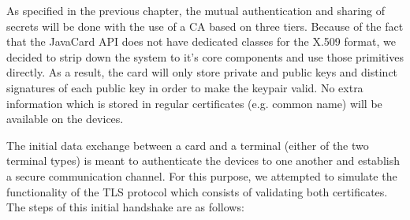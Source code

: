 As specified in the previous chapter, the mutual authentication and sharing of secrets will be done with the use of a CA based on three tiers. Because of the fact that the JavaCard API does not have dedicated classes for the X.509 format, we decided to strip down the system to it's core components and use those primitives directly. As a result, the card will only store private and public keys and distinct signatures of each public key in order to make the keypair valid. No extra information which is stored in regular certificates (e.g. common name) will be available on the devices.

The initial data exchange between a card and a terminal (either of the two terminal types) is meant to authenticate the devices to one another and establish a secure communication channel. For this purpose, we attempted to simulate the functionality of the TLS protocol which consists of validating both certificates. The steps of this initial handshake are as follows:
